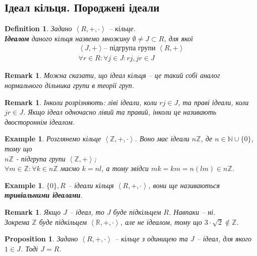 \documentclass[a4paper, 10pt]{article}
\theoremstyle{theoremdd}
\theoremstyle{theoremdd}
\newtheorem{definition}[theorem]{Definition}
\theoremstyle{theoremdd}
\theoremstyle{theoremdd}
\theoremstyle{theoremdd}
\newtheorem{example}[theorem]{Example}
\theoremstyle{theoremdd}
\theoremstyle{theoremdd}
\theoremstyle{theoremdd}
\theoremstyle{theoremdd}
\newtheorem{proposition}[theorem]{Proposition}
\theoremstyle{theoremdd}
\theoremstyle{theoremdd}
\newtheorem{remark}[theorem]{Remark}
\theoremstyle{theoremdd}
\theoremstyle{theoremdd}
\theoremstyle{theoremdd}
\theoremstyle{theoremdd}
\begin{document}
\subsection{Ідеал кільця. Породжені ідеали}
\begin{definition}
Задано $\left<R,+,\cdot \right>$ -- кільце.\\
\textbf{Ідеалом} даного кільця назвемо множину $\emptyset \neq J \subset R$, для якої
\begin{align*}
\left<J,+ \right> \text{-- підгрупа групи } \left<R,+\right> \\
\forall r \in R: \forall j \in J: rj, jr \in J
\end{align*}
\end{definition}

\begin{remark}
Можна сказати, що ідеал кільця -- це такий собі аналог нормального дільника групи в теорії груп.
\end{remark}

\begin{remark}
Інколи розрізняють: ліві ідеали, коли $rj \in J$, та праві ідеали, коли $jr \in J$. Якщо ідеал одночасно лівий та правий, інколи це називають двостороннім ідеалом.
\end{remark}

\begin{example}
Розглянемо кільце $\left< \mathbb{Z},+,\cdot \right>$. Воно має ідеали $n \mathbb{Z}$, де $n \in \mathbb{N} \cup \{0\}$, тому що\\
$n\mathbb{Z}$ - підгрупа групи $\left<\mathbb{Z},+ \right>$;\\
$\forall m \in \mathbb{Z}: \forall k \in n\mathbb{Z}$ маємо $k = nl$, а тому звідси $mk = km = n(lm) \in n\mathbb{Z}$.
\end{example}

\begin{example}
$\{0\}, R$ -- ідеали кільця $\left<R,+,\cdot \right>$, вони ще називаються \textbf{тривіальними ідеалами}.
\end{example}

\begin{remark}
Якщо $J$ -- ідеал, то $J$ буде підкільцем $R$. Навпаки -- ні.\\
Зокрема $\mathbb{Z}$ буде підкільцем $\left<\mathbb{R},+,\cdot\right>$, але не ідеалом, тому що $3 \cdot \sqrt{2} \not \in \mathbb{Z}$.
\end{remark}

\begin{proposition}
Задано $\left<R,+,\cdot \right>$ -- кільце з одиницею та $J$ -- ідеал, для якого $1 \in J$. Тоді $J = R$.
\end{proposition}
\end{document}
